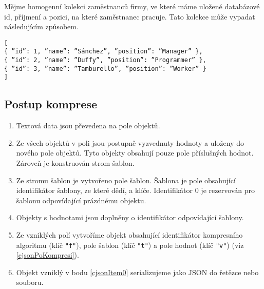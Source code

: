 Mějme homogenní kolekci zaměstnanců firmy, ve které máme uložené databázové id, příjmení a pozici, na které zaměstnanec pracuje. Tato kolekce může vypadat následujícím způsobem.

\texttt{[\\
\hspace*{5mm}\{ \textquotedblright id\textquotedblright : 1, \textquotedblright name\textquotedblright : \textquotedblright Sánchez\textquotedblright, \textquotedblright position\textquotedblright : \textquotedblright Manager\textquotedblright\ \},\\
\hspace*{5mm}\{ \textquotedblright id\textquotedblright : 2, \textquotedblright name\textquotedblright : \textquotedblright Duffy\textquotedblright, \textquotedblright position\textquotedblright : \textquotedblright Programmer\textquotedblright\ \},\\
\hspace*{5mm}\{ \textquotedblright id\textquotedblright : 3, \textquotedblright name\textquotedblright : \textquotedblright Tamburello\textquotedblright, \textquotedblright position\textquotedblright : \textquotedblright Worker\textquotedblright\ \}\\
]}

\subsection{Postup komprese}
\begin{enumerate}
\item Textová data jsou převedena na pole objektů.
\item Ze všech objektů v poli jsou postupně vyzvednuty hodnoty a uloženy do nového pole objektů. Tyto objekty obsahují pouze pole příslušných hodnot. Zároveň je konstruován strom šablon.
\item Ze stromu šablon je vytvořeno pole šablon. Šablona je pole obsahující identifikátor šablony, ze které dědí, a klíče. Identifikátor 0 je rezervován pro šablonu odpovídající prázdnému objektu.
\item Objekty s hodnotami jsou doplněny o identifikátor odpovídající šablony.
\item \label{cjsonItem0}Ze vzniklých polí vytvoříme objekt obsahující identifikátor kompresního algoritmu (klíč \texttt{"f"}), pole šablon (klíč \texttt{"t"}) a pole hodnot (klíč \texttt{"v"}) (viz \ref{cjsonPoKompresi}).
\item Objekt vzniklý v bodu \ref{cjsonItem0} serializujeme jako JSON do řetězce nebo souboru.
\end{enumerate}

